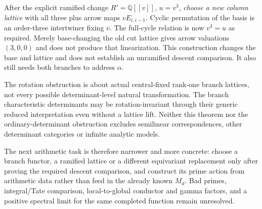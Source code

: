 After the explicit ramified change $R'=\mathbb Q[[v]]$, $u=v^3$, \emph{choose a new column lattice} with all three plus arrow maps $vE_{i,i-1}$. Cyclic permutation of the basis is an order-three intertwiner fixing $v$. The full-cycle relation is now $v^3=u$ as required. Merely base-changing the old cut lattice gives arrow valuations $(3,0,0)$ and does not produce that linearization. This construction changes the base and lattice and does not establish an unramified descent comparison. It also still needs both branches to address $\alpha$.

The rotation obstruction is about actual central-fixed rank-one branch lattices, not every possible determinant-level natural transformation. The branch characteristic determinants may be rotation-invariant through their generic reduced interpretation even without a lattice lift. Neither this theorem nor the ordinary-determinant obstruction excludes semilinear correspondences, other determinant categories or infinite analytic models.

The next arithmetic task is therefore narrower and more concrete: choose a branch functor, a ramified lattice or a different equivariant replacement only after proving the required descent comparison, and construct its prime action from arithmetic data rather than feed in the already known $M_d$. Bad primes, integral/Tate comparison, local-to-global conductor and gamma factors, and a positive spectral limit for the same completed function remain unresolved.
